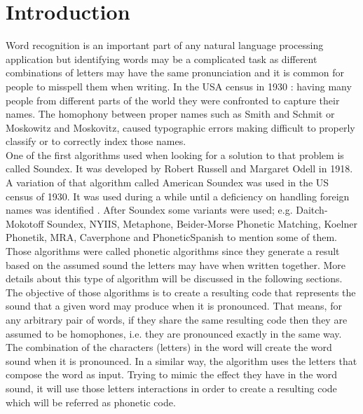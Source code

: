 \documentclass[9pt,conference]{IEEEtran}
\begin{document}
\section{Introduction}
Word recognition is an important part of any natural language processing 
application but identifying words may be a complicated task as different 
combinations of letters may have the same pronunciation and it is common 
for people to misspell them when writing. In the USA census in 1930 \cite{ref:27}: 
having many people from different parts of the world they were confronted 
to capture their names. The homophony between proper names such as 
Smith and Schmit or Moskowitz and Moskovitz, caused typographic errors 
making difficult to properly classify or to correctly index those names.\\

One of the first algorithms used when looking for a solution to that problem 
is called Soundex. It was developed by Robert Russell and Margaret Odell 
in 1918\cite{ref:28, ref:33}. A variation of that algorithm called American 
Soundex was used in the US census of 1930\cite{ref:01, ref:02, ref:25}. 
It was used during a while until a deficiency on handling foreign names 
was identified \cite{ref:08,ref:32,ref:24}. After Soundex some variants were 
used; e.g. Daitch-Mokotoff Soundex\cite{ref:38}, NYIIS\cite{ref:29}, 
Metaphone\cite{ref:29}, Beider-Morse Phonetic Matching\cite{ref:30}, 
Koelner Phonetik, MRA, Caverphone\cite{ref:29} and PhoneticSpanish\cite{ref:09} 
to mention some of them. Those algorithms were called phonetic algorithms 
since they generate a result based on the assumed sound the letters may 
have when written together. More details about this type of algorithm 
will be discussed in the following sections.\\

The objective of those algorithms is to create a resulting code that represents
the sound that a given word may produce when it is pronounced. That means, 
for any arbitrary pair of words, if they share the same resulting code then they are
assumed to be homophones, i.e. they are pronounced exactly in the same way. 
The combination of the characters (letters) in the word will create the word sound 
when it is pronounced. In a similar way, the algorithm uses the letters that compose 
the word as input. Trying to mimic the effect they have in the word sound, it will use 
those letters interactions in order to create a resulting code which will be referred as 
phonetic code. \\
\end{document}
